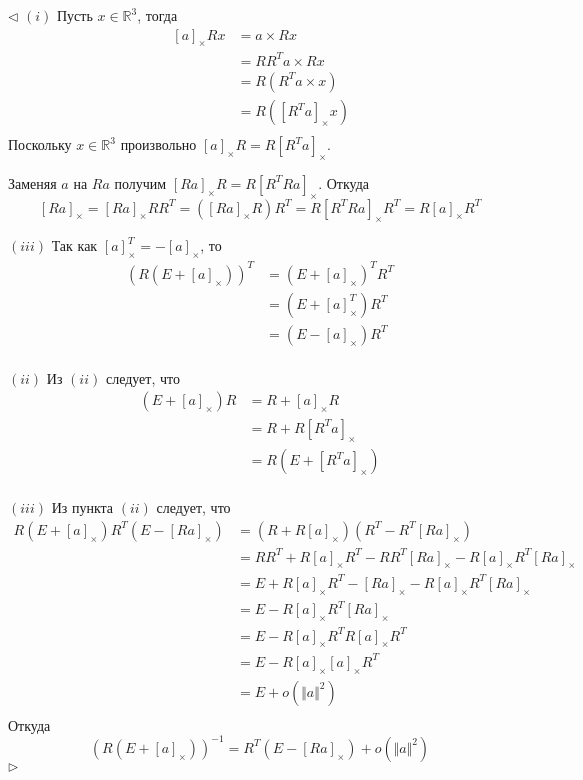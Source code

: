 \documentclass[12pt]{article}
\newenvironment{proof}{\par $\triangleleft$}{$\triangleright$}
\begin{document}
\begin{proof}
    $(i)$ Пусть $x\in\mathbb{R}^3$, тогда
    $$
        \begin{aligned}
            \,[a]_\times R x
             & = a\times Rx         \\
             & = RR^Ta\times Rx     \\
             & = R(R^Ta\times x)    \\
             & = R([R^Ta]_\times x) \\
        \end{aligned}
    $$
    Поскольку $x\in\mathbb{R}^3$ произвольно $[a]_\times R=R[R^Ta]_\times$.

    Заменяя $a$ на $Ra$ получим $[Ra]_\times R=R[R^TRa]_\times$. Откуда
    $$
        [Ra]_\times=[Ra]_\times RR^T=([Ra]_\times R)R^T
        =R[R^TRa]_\times R^T=R[a]_\times R^T
    $$

    $(iii)$ Так как $[a]_\times^T=-[a]_\times$, то
    $$
        \begin{aligned}
            (R(E+[a]_\times))^T
             & =(E+[a]_\times)^T R^T \\
             & =(E+[a]_\times^T) R^T \\
             & =(E-[a]_\times) R^T   \\
        \end{aligned}
    $$

    $(ii)$ Из $(ii)$ следует, что
    $$
        \begin{aligned}
            (E+[a]_\times) R
             & = R+[a]_\times R     \\
             & = R+R[R^Ta]_\times   \\
             & = R(E+[R^Ta]_\times) \\
        \end{aligned}
    $$

    $(iii)$ Из пункта $(ii)$ следует, что
    $$
        \begin{aligned}
            R(E+[a]_\times) R^T(E-[Ra]_\times)
             & =(R+R[a]_\times)(R^T - R^T[Ra]_\times)                                \\
             & =R R^T+R[a]_\times R^T - R R^T[Ra]_\times- R[a]_\times R^T[Ra]_\times \\
             & =E+R[a]_\times R^T - [Ra]_\times- R[a]_\times R^T[Ra]_\times          \\
             & =E - R[a]_\times R^T[Ra]_\times                                       \\
             & =E - R[a]_\times R^TR[a]_\times R^T                                   \\
             & =E - R[a]_\times [a]_\times R^T                                       \\
             & =E + o(\Vert a\Vert^2)                                                \\
        \end{aligned}
    $$
    Откуда
    $$
        (R(E+[a]_\times))^{-1}=R^T(E-[Ra]_\times)+o(\Vert a\Vert^2)
    $$
\end{proof}
\end{document}
